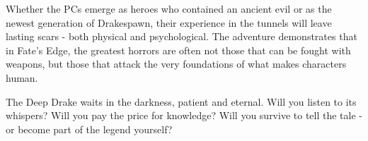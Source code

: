 \documentclass[11pt]{article}
\begin{document}
Whether the PCs emerge as heroes who contained an ancient evil or as the newest generation of Drakespawn, their experience in the tunnels will leave lasting scars - both physical and psychological. The adventure demonstrates that in Fate's Edge, the greatest horrors are often not those that can be fought with weapons, but those that attack the very foundations of what makes characters human.

The Deep Drake waits in the darkness, patient and eternal. Will you listen to its whispers? Will you pay the price for knowledge? Will you survive to tell the tale - or become part of the legend yourself?
\end{document}

